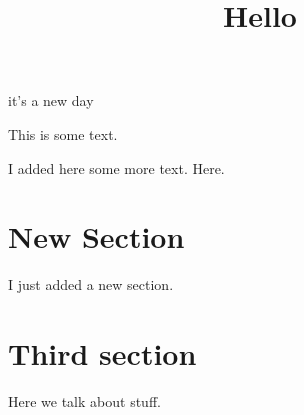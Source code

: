 \documentclass{article}
\title{Hello}
\begin{document}
\maketitle

it's a new day
	
This is some text.

I added here some more text. Here. 

\section{New Section}

I just added a new section. 


\section{Third section}

Here we talk about stuff. 
\end{document}
